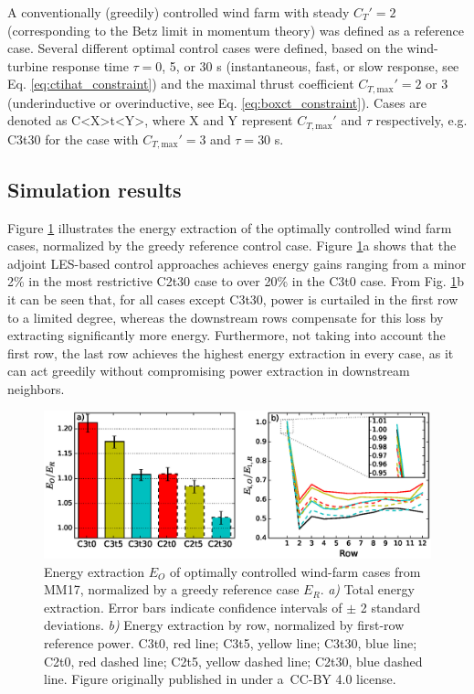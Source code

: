 \documentclass[wes, manuscript]{copernicus}
\begin{document}
A conventionally (greedily) controlled wind farm with steady $C_T' = 2$ (corresponding to the Betz limit in momentum theory) was defined as a reference case. Several different optimal control cases were defined, based on the wind-turbine response time $\tau = $0, 5, or 30 s (instantaneous, fast, or slow response, see Eq. \ref{eq:ctihat_constraint}) and the maximal thrust coefficient $C_{T,\text{max}}' = 2$ or 3 (underinductive or overinductive, see Eq. \ref{eq:boxct_constraint}). Cases are denoted as C<X>t<Y>, where X and Y represent $C_{T,\text{max}}'$ and $\tau$ respectively, e.g. C3t30  for the case with $C_{T,\text{max}}' = 3$ and $\tau = 30$ s. 

\subsection{Simulation results}

Figure \ref{fig:power_MM17} illustrates the energy extraction of the optimally controlled wind farm cases, normalized by the greedy reference control case. Figure \ref{fig:power_MM17}a shows that the adjoint LES-based control approaches achieves energy gains ranging from a minor 2\% in the most restrictive C2t30 case to over 20\% in the C3t0 case. From Fig. \ref{fig:power_MM17}b it can be seen that, for all cases except C3t30, power is curtailed in the first row to a limited degree, whereas the downstream rows compensate for this loss by extracting significantly more energy. Furthermore, not taking into account the first row, the last row achieves the highest energy extraction in every case, as it can act greedily without compromising power extraction in downstream neighbors. 

\begin{figure}
	\includegraphics[width=\textwidth]{figure3}
	\caption{Energy extraction $E_O$ of optimally controlled wind-farm cases from MM17, normalized by a greedy reference case $E_R$. \emph{a)} Total energy extraction. Error bars indicate confidence intervals of $\pm$ 2 standard deviations. \emph{b)} Energy extraction by row, normalized by first-row reference power. C3t0, red line; C3t5, yellow line; C3t30, blue line; C2t0, red dashed line; C2t5, yellow dashed line; C2t30, blue dashed line. Figure originally published in \cite{munters2017optimal} under a~CC-BY 4.0 license.\label{fig:power_MM17}}
\end{figure}
\end{document}

